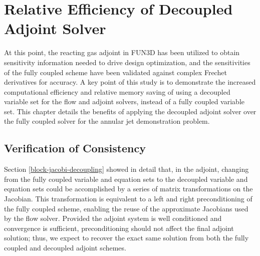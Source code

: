 \chapter{Relative Efficiency of Decoupled Adjoint Solver}
\label{chapter-nine}

At this point, the reacting gas adjoint in FUN3D has been utilized to obtain
sensitivity information needed to drive design optimization, and the
sensitivities of the fully coupled scheme have been validated against complex
Frechet derivatives for accuracy.  A key point of this study is to demonstrate
the increased computational efficiency and relative memory saving of using a
decoupled variable set for the flow and adjoint solvers, instead of a fully
coupled variable set.  This chapter details the benefits of applying the
decoupled adjoint solver over the fully coupled solver for the annular jet
demonstration problem.

\section{Verification of Consistency}
\label{adj-consistency}

Section \ref{block-jacobi-decoupling} showed in detail that, in the adjoint,
changing from the fully coupled variable and equation sets to the decoupled
variable and equation sets could be accomplished by a series of matrix
transformations on the Jacobian.  This transformation is equivalent to a left
and right preconditioning of the fully coupled scheme, enabling the reuse of the
approximate Jacobians used by the flow solver.  Provided the adjoint system is
well conditioned and convergence is sufficient, preconditioning should not
affect the final adjoint solution; thus, we expect to recover the exact same
solution from both the fully coupled and decoupled adjoint schemes.

